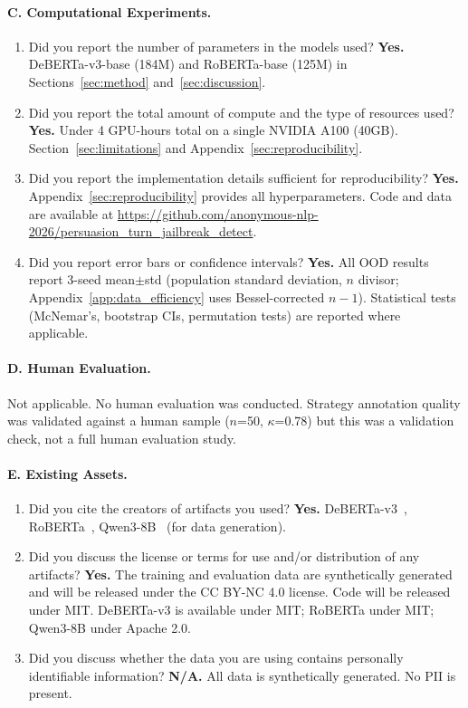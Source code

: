 \paragraph{C. Computational Experiments.}
\begin{enumerate}[label=C\arabic*.,leftmargin=2em]
  \item Did you report the number of parameters in the models used? \textbf{Yes.} DeBERTa-v3-base (184M) and RoBERTa-base (125M) in Sections~\ref{sec:method} and~\ref{sec:discussion}.
  \item Did you report the total amount of compute and the type of resources used? \textbf{Yes.} Under 4 GPU-hours total on a single NVIDIA A100 (40GB). Section~\ref{sec:limitations} and Appendix~\ref{sec:reproducibility}.
  \item Did you report the implementation details sufficient for reproducibility? \textbf{Yes.} Appendix~\ref{sec:reproducibility} provides all hyperparameters. Code and data are available at \url{https://github.com/anonymous-nlp-2026/persuasion_turn_jailbreak_detect}.
  \item Did you report error bars or confidence intervals? \textbf{Yes.} All OOD results report 3-seed mean$\pm$std (population standard deviation, $n$ divisor; Appendix~\ref{app:data_efficiency} uses Bessel-corrected $n{-}1$). Statistical tests (McNemar's, bootstrap CIs, permutation tests) are reported where applicable.
\end{enumerate}

\paragraph{D. Human Evaluation.}
Not applicable. No human evaluation was conducted. Strategy annotation quality was validated against a human sample ($n$=50, $\kappa$=0.78) but this was a validation check, not a full human evaluation study.

\paragraph{E. Existing Assets.}
\begin{enumerate}[label=E\arabic*.,leftmargin=2em]
  \item Did you cite the creators of artifacts you used? \textbf{Yes.} DeBERTa-v3~\citep{he2023debertav3}, RoBERTa~\citep{liu2019roberta}, Qwen3-8B~\citep{qwen3_2025} (for data generation).
  \item Did you discuss the license or terms for use and/or distribution of any artifacts? \textbf{Yes.} The training and evaluation data are synthetically generated and will be released under the CC BY-NC 4.0 license. Code will be released under MIT. DeBERTa-v3 is available under MIT; RoBERTa under MIT; Qwen3-8B under Apache 2.0.
  \item Did you discuss whether the data you are using contains personally identifiable information? \textbf{N/A.} All data is synthetically generated. No PII is present.
\end{enumerate}
